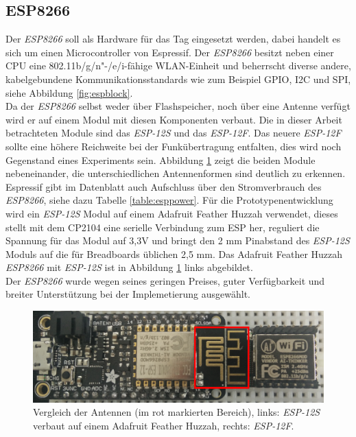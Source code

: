 \subsection{ESP8266}
Der \emph{ESP8266} soll als Hardware für das Tag eingesetzt werden, dabei handelt es sich um einen Microcontroller von Espressif.
Der \emph{ESP8266} besitzt neben einer CPU eine 802.11b/g/n"-/e/i-fähige WLAN-Einheit und beherrscht diverse andere, kabelgebundene Kommunikationsstandards wie zum Beispiel GPIO, I2C und SPI, siehe Abbildung \ref{fig:espblock}. \\
Da der \emph{ESP8266} selbst weder über Flashspeicher, noch über eine Antenne verfügt wird er auf einem Modul mit diesen Komponenten verbaut. 
Die in dieser Arbeit betrachteten Module sind das \emph{ESP-12S} und das \emph{ESP-12F}.
Das neuere \emph{ESP-12F} sollte eine höhere Reichweite bei der Funkübertragung entfalten, dies wird noch Gegenstand eines Experiments sein.
Abbildung \ref{fig:espmodules} zeigt die beiden Module nebeneinander, die unterschiedlichen Antennenformen sind deutlich zu erkennen.\\
Espressif gibt im Datenblatt auch Aufschluss über den Stromverbrauch des \emph{ESP8266}, siehe dazu Tabelle \ref{table:esppower}.
Für die Prototypenentwicklung wird ein \emph{ESP-12S} Modul auf einem Adafruit Feather Huzzah verwendet, dieses stellt mit dem CP2104 eine serielle Verbindung zum ESP her, reguliert die Spannung für das Modul auf 3,3V und bringt den 2 mm Pinabstand des \emph{ESP-12S} Moduls auf die für Breadboards üblichen 2,5 mm.
Das Adafruit Feather Huzzah \emph{ESP8266} mit \emph{ESP-12S} ist in Abbildung \ref{fig:espmodules} links abgebildet.\\
Der \emph{ESP8266} wurde wegen seines geringen Preises, guter Verfügbarkeit und breiter Unterstützung bei der Implemetierung ausgewählt.

\begin{figure}[h]
  \centering
	\includegraphics[width=\textwidth]{images/espmodules.png}
  \caption{Vergleich der Antennen (im rot markierten Bereich), links: \emph{ESP-12S} verbaut auf einem Adafruit Feather Huzzah, rechts: \emph{ESP-12F}.}
  \label{fig:espmodules}
\end{figure}

